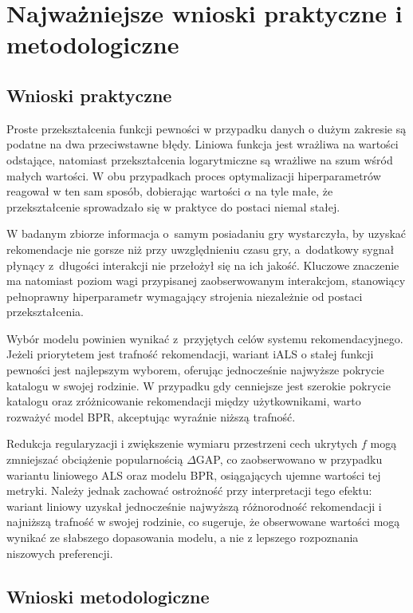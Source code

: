 \section{Najważniejsze wnioski praktyczne i metodologiczne}

\subsection{Wnioski praktyczne}

Proste przekształcenia funkcji pewności w przypadku danych o dużym zakresie są podatne na dwa przeciwstawne błędy. Liniowa funkcja jest wrażliwa na wartości odstające, natomiast przekształcenia logarytmiczne są wrażliwe na szum wśród małych wartości. W obu przypadkach proces optymalizacji hiperparametrów reagował w ten sam sposób, dobierając wartości $\alpha$ na tyle małe, że przekształcenie sprowadzało się w praktyce do postaci niemal stałej.

W badanym zbiorze informacja o~samym posiadaniu gry wystarczyła, by uzyskać rekomendacje nie gorsze niż przy uwzględnieniu czasu gry, a~dodatkowy sygnał płynący z~długości interakcji nie przełożył się na ich jakość. Kluczowe znaczenie ma natomiast poziom wagi przypisanej zaobserwowanym interakcjom, stanowiący pełnoprawny hiperparametr wymagający strojenia niezależnie od postaci przekształcenia.

Wybór modelu powinien wynikać z~przyjętych celów systemu rekomendacyjnego. Jeżeli priorytetem jest trafność rekomendacji, wariant iALS o stałej funkcji pewności jest najlepszym wyborem, oferując jednocześnie najwyższe pokrycie katalogu w swojej rodzinie. W przypadku gdy cenniejsze jest szerokie pokrycie katalogu oraz zróżnicowanie rekomendacji między użytkownikami, warto rozważyć model BPR, akceptując wyraźnie niższą trafność.

Redukcja regularyzacji i zwiększenie wymiaru przestrzeni cech ukrytych $f$ mogą zmniejszać obciążenie popularnością $\Delta$GAP, co zaobserwowano w przypadku wariantu liniowego ALS oraz modelu BPR, osiągających ujemne wartości tej metryki. Należy jednak zachować ostrożność przy interpretacji tego efektu: wariant liniowy uzyskał jednocześnie najwyższą różnorodność rekomendacji i najniższą trafność w swojej rodzinie, co sugeruje, że obserwowane wartości mogą wynikać ze słabszego dopasowania modelu, a nie z lepszego rozpoznania niszowych preferencji.

\subsection{Wnioski metodologiczne}

